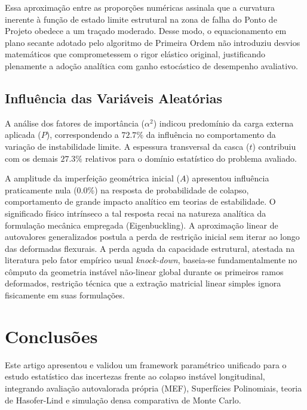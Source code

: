\documentclass[12pt,a4paper]{article}
\begin{document}
Essa aproximação entre as proporções numéricas assinala que a curvatura inerente à função de estado limite estrutural na zona de falha do Ponto de Projeto obedece a um traçado moderado. Desse modo, o equacionamento em plano secante adotado pelo algoritmo de Primeira Ordem não introduziu desvios matemáticos que comprometessem o rigor elástico original, justificando plenamente a adoção analítica com ganho estocástico de desempenho avaliativo.

\subsection{Influência das Variáveis Aleatórias}
A análise dos fatores de importância ($\alpha^2$) indicou predomínio da carga externa aplicada ($P$), correspondendo a $72.7\%$ da influência no comportamento da variação de instabilidade limite. A espessura transversal da casca ($t$) contribuiu com os demais $27.3\%$ relativos para o domínio estatístico do problema avaliado.

A amplitude da imperfeição geométrica inicial ($A$) apresentou influência praticamente nula (0.0\%) na resposta de probabilidade de colapso, comportamento de grande impacto analítico em teorias de estabilidade. O significado físico intrínseco a tal resposta recai na natureza analítica da formulação mecânica empregada (Eigenbuckling). A aproximação linear de autovalores generalizados postula a perda de restrição inicial sem iterar ao longo das deformadas flexurais. A perda aguda da capacidade estrutural, atestada na literatura pelo fator empírico usual \textit{knock-down}, baseia-se fundamentalmente no cômputo da geometria instável não-linear global durante os primeiros ramos deformados, restrição técnica que a extração matricial linear simples ignora fisicamente em suas formulações.

\section{Conclusões}
Este artigo apresentou e validou um framework paramétrico unificado para o estudo estatístico das incertezas frente ao colapso instável longitudinal, integrando avaliação autovalorada própria (MEF), Superfícies Polinomiais, teoria de Hasofer-Lind e simulação densa comparativa de Monte Carlo.
\end{document}
